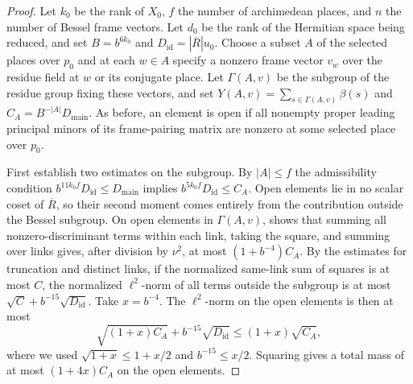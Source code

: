 \begin{proof}
Let $k_0$ be the rank of $X_0$, $f$ the number of archimedean places, and $n$ the number of Bessel frame vectors.
Let $d_0$ be the rank of the Hermitian space being reduced, and set $B=b^{6k_0}$ and $D_{\mathrm{id}}=|\overline R|u_0$.
Choose a subset $A$ of the selected places over $p_0$ and at each $w\in A$ specify a nonzero frame vector $v_w$ over the residue field at $w$ or its conjugate place.
Let $\Gamma(A,v)$ be the subgroup of the residue group fixing these vectors,
and set $Y(A,v)=\sum_{s\in\Gamma(A,v)}\beta(s)$ and $C_A=B^{-|A|}D_{\mathrm{main}}$.
As before, an element is open if all nonempty proper leading principal minors of its frame-pairing matrix are nonzero at some selected place over $p_0$.

First establish two estimates on the subgroup. By $|A|\le f$ the admissibility condition
$b^{11k_0f}D_{\mathrm{id}}\le D_{\mathrm{main}}$
implies $b^{5k_0f}D_{\mathrm{id}}\le C_A$.
Open elements lie in no scalar coset of $\overline R$, so their second moment comes entirely from the contribution outside the Bessel subgroup.
On open elements in $\Gamma(A,v)$,  shows that summing all nonzero-discriminant terms within each link,
taking the square, and summing over links gives, after division by $\nu^2$, at most $(1+b^{-4})C_A$.
By the estimates for truncation and distinct links, if the normalized same-link sum of squares is at most $C$,
the normalized \(\ell^2\)-norm of all terms outside the subgroup is at most
$\sqrt C+b^{-15}\sqrt{D_{\mathrm{id}}}$.
Take $x=b^{-4}$. The \(\ell^2\)-norm on the open elements is then at most
\[
 \sqrt{(1+x)C_A}+b^{-15}\sqrt{D_{\mathrm{id}}}
 \le (1+x)\sqrt{C_A},
\]
where we used $\sqrt{1+x}\le1+x/2$ and $b^{-15}\le x/2$.
Squaring gives a total mass of at most $(1+4x)C_A$ on the open elements.


\end{proof}
